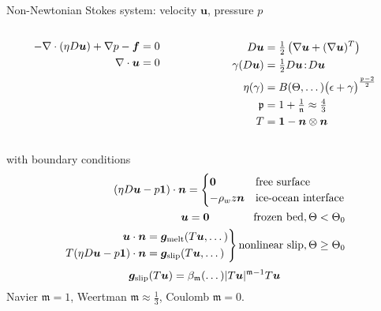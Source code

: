 \begin{frame}{Non-Newtonian Stokes system: velocity $\bm u$, pressure $p$}
\begin{columns}
\begin{column}{0.5\textwidth}
  \alert{\begin{align*}
    -\nabla \cdot(\eta D\bm u) + \nabla p - \bm f &= 0 \\
    \nabla \cdot \bm u &= 0
  \end{align*}}
\end{column}
\begin{column}{0.5\textwidth}
    \begin{align*}
      D\bm u &= \tfrac 1 2 \left(\nabla \bm u + (\nabla \bm u)^T \right) \\
      \gamma(D\bm u) &= \tfrac 1 2 D\bm u \!:\! D\bm u \\
      \eta(\gamma) &= B(\Theta,\dotsc)\big(\epsilon + \gamma \big)^{\frac{\mathfrak{p}-2}{2}} \\
      \mathfrak{p} &= 1 + \tfrac{1}{\mathfrak{n}} \approx \tfrac 4 3 \\
      T &= \bm 1 - \bm n \otimes \bm n \\
    \end{align*}
\end{column}
\end{columns}
\vspace{-1.5em}
    with boundary conditions
    \begin{align*}
      (\eta D\bm u - p\bm 1)\cdot\bm n =
      \begin{cases}\bm 0 & \text{free surface} \\
        -\rho_w z \bm n & \text{ice-ocean interface}\end{cases} \\
      \bm u = \bm 0\qquad\qquad \text{frozen bed}, \Theta < \Theta_0 \\
      \left. \begin{aligned}
          \bm u \cdot \bm n &= \bm g_{\text{melt}}(T\bm u,\dotsc) \\
          T (\eta D\bm u - p\bm 1)\cdot\bm n &= \bm g_{\text{slip}}(T \bm u,\dotsc) \end{aligned}\right\}
      \text{nonlinear slip}, \Theta \ge \Theta_0 \\
    \end{align*}
    \vspace{-3em}
    \[ \bm g_{\text{slip}}(T\bm u) = \beta_{\mathfrak{m}}(\dotsc) \lvert T\bm u \rvert^{\mathfrak{m}-1} T \bm u \]
    Navier $\mathfrak{m}=1$, \quad Weertman $\mathfrak{m}\approx \frac 1 3$, \quad Coulomb $\mathfrak{m}=0$.
\end{frame}

